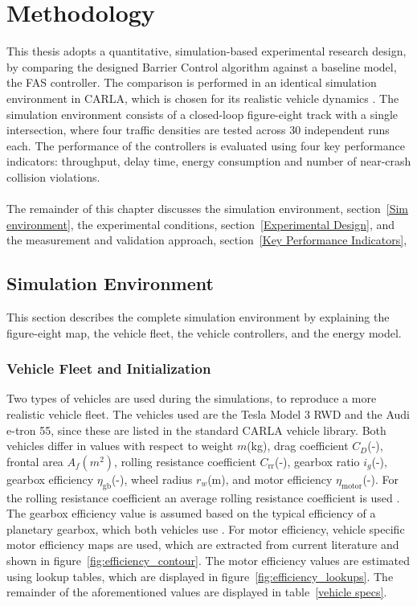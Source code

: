 \section{Methodology}
\label{Methodology}
This thesis adopts a quantitative, simulation-based experimental research design, by comparing the designed Barrier Control algorithm against a baseline model, the FAS controller. The comparison is performed in an identical simulation environment in CARLA, which is chosen for its realistic vehicle dynamics \parencite{dosovitskiy2017carla}. The simulation environment consists of a closed-loop figure-eight track with a single intersection, where four traffic densities are tested across 30 independent runs each. The performance of the controllers is evaluated using four key performance indicators: throughput, delay time, energy consumption and number of near-crash collision violations. 
\\\\
The remainder of this chapter discusses the simulation environment, section~\ref{Sim environment}, the experimental conditions, section~\ref{Experimental Design}, and the measurement and validation approach, section~\ref{Key Performance Indicators},


 
\subsection{Simulation Environment}
This section describes the complete simulation environment by explaining the figure-eight map, the vehicle fleet, the vehicle controllers, and the energy model. 
\label{Sim environment}

\subsubsection{Vehicle Fleet and Initialization}
\label{Vehicle Fleet}
Two types of vehicles are used during the simulations, to reproduce a more realistic vehicle fleet. The vehicles used are the Tesla Model 3 RWD and the Audi e-tron 55, since these are listed in the standard CARLA vehicle library. Both vehicles differ in values with respect to weight \(m\)(kg), drag coefficient \(C_D\)(-), frontal area \(A_f(m^2)\), rolling resistance coefficient \(C_\text{rr}\)(-), gearbox ratio \(i_g\)(-), gearbox efficiency \(\eta_\text{gb}\)(-), wheel radius \(r_w\)(m), and motor efficiency \(\eta_\text{motor}\)(-). For the rolling resistance coefficient an average rolling resistance coefficient is used \parencite{swieczko2017tyre}. The gearbox efficiency value is assumed based on the typical efficiency of a planetary gearbox, which both vehicles use \parencite{lacock2023electric}. For motor efficiency, vehicle specific motor efficiency maps are used, which are extracted from current literature \parencite{rosenberger2024quantifying,thomas2021comparative} and shown in figure~\ref{fig:efficiency_contour}. The motor efficiency values are estimated using lookup tables, which are displayed in figure~\ref{fig:efficiency_lookups}. The remainder of the aforementioned values are displayed in table~\ref{vehicle specs}.

